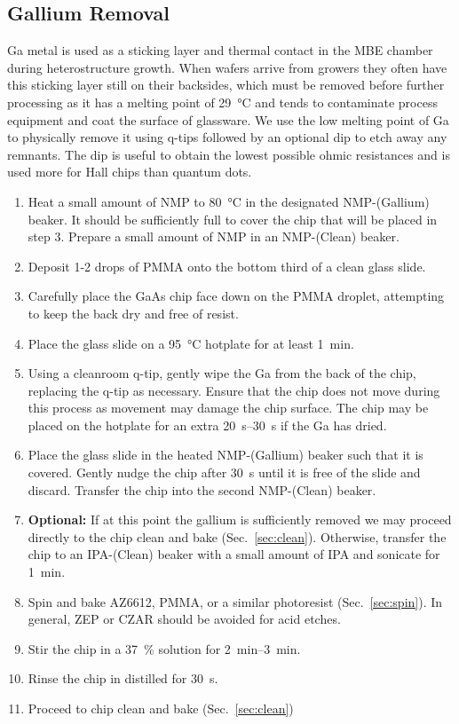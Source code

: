\subsection{Gallium Removal}
\label{sec:garem}
Ga metal is used as a sticking layer and thermal contact in the MBE chamber during heterostructure growth. When wafers
arrive from growers they often have this sticking layer still on their backsides, which must be removed before further processing
as it has a melting point of \SI{29}{\celsius} and tends to contaminate process equipment and coat the surface of glassware.
We use the low melting point of Ga to physically remove it using q-tips followed by an optional  dip to etch away any remnants.
The  dip is useful to obtain the lowest possible ohmic resistances and is used more for Hall chips than quantum dots.
\begin{enumerate}
    \item Heat a small amount of NMP to \SI{80}{\celsius} in the designated NMP-(Gallium) beaker. It should be sufficiently full to cover the chip that will be placed in step 3. Prepare a small amount of NMP in an NMP-(Clean) beaker.
    \item Deposit 1-2 drops of PMMA onto the bottom third of a clean glass slide.
    \item Carefully place the GaAs chip face down on the PMMA droplet, attempting to keep the back dry and free of resist.
    \item Place the glass slide on a \SI{95}{\celsius} hotplate for at least \SI{1}{\minute}.
    \item Using a cleanroom q-tip, gently wipe the Ga from the back of the chip, replacing the q-tip as necessary. Ensure that the chip does not move during this process as movement may damage the chip surface. The chip may be placed on the hotplate for an extra \SIrange{20}{30}{\second} if the Ga has dried.
    \item Place the glass slide in the heated NMP-(Gallium) beaker such that it is covered. Gently nudge the chip after \SI{30}{\second} until it is free of the slide and discard. Transfer the chip into the second NMP-(Clean) beaker.
    \item \textbf{Optional:} If at this point the gallium is sufficiently removed we may proceed directly to the chip clean and bake (Sec.~\ref{sec:clean}). Otherwise, transfer the chip to an IPA-(Clean) beaker with a small amount of IPA and sonicate for \SI{1}{\minute}.
    \item Spin and bake AZ6612, PMMA, or a similar photoresist (Sec.~\ref{sec:spin}). In general, ZEP or CZAR should be avoided for acid etches.
    \item Stir the chip in a \SI{37}{\percent}  solution for \SIrange{2}{3}{\minute}.
    \item Rinse the chip in distilled  for \SI{30}{\second}.
    \item Proceed to chip clean and bake (Sec.~\ref{sec:clean})
\end{enumerate}

